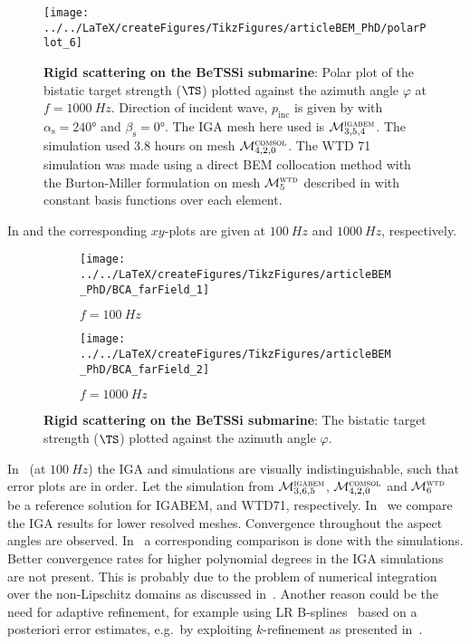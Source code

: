 \begin{figure}
	\centering
	\texttt{[image: ../../LaTeX/createFigures/TikzFigures/articleBEM\_PhD/polarPlot\_6]}
	\caption{\textbf{Rigid scattering on the BeTSSi submarine}: Polar plot of the bistatic target strength ($\TS$) plotted against the azimuth angle $\varphi$ at $f=\SI{1000}{Hz}$. Direction of incident wave, $p_{\mathrm{inc}}$ is given by  with $\alpha_{\mathrm{s}}=\ang{240}$ and $\beta_{\mathrm{s}}=\ang{0}$. The IGA mesh here used is ${\cal M}_{3,5,4}^{\textsc{igabem}}$. The \COMSOL simulation used \num{3.8} hours on mesh ${\cal M}_{4,2,0}^{\textsc{comsol}}$. The WTD 71 simulation was made using a direct BEM collocation method with the Burton-Miller formulation on mesh ${\cal M}_{5}^{\textsc{wtd}}$ described in  with constant basis functions over each element.}
	\label{Eq3:polar_BI}
\end{figure}
In  and  the corresponding $xy$-plots are given at $\SI{100}{Hz}$ and $\SI{1000}{Hz}$, respectively.
\begin{figure}
	\centering
	\begin{subfigure}[t]{\textwidth}
		\texttt{[image: ../../LaTeX/createFigures/TikzFigures/articleBEM\_PhD/BCA\_farField\_1]}
		\caption{$f=\SI{100}{Hz}$}
		\label{Fig3:xy_BI_100}
	\end{subfigure} 
	\par\bigskip
	\par\bigskip
	\begin{subfigure}[t]{\textwidth}
		\texttt{[image: ../../LaTeX/createFigures/TikzFigures/articleBEM\_PhD/BCA\_farField\_2]}
		\caption{$f=\SI{1000}{Hz}$}
		\label{Fig3:xy_BI_1000}
	\end{subfigure} 
	\caption{\textbf{Rigid scattering on the BeTSSi submarine}: The bistatic target strength ($\TS$) plotted against the azimuth angle $\varphi$.}
\end{figure}
In~ (at $\SI{100}{Hz}$) the IGA and \COMSOL simulations are visually indistinguishable, such that error plots are in order. Let the simulation from ${\cal M}_{3,6,5}^{\textsc{igabem}}$, ${\cal M}_{4,2,0}^{\textsc{comsol}}$ and ${\cal M}_{6}^{\textsc{wtd}}$ be a reference solution for IGABEM, \COMSOL and WTD71, respectively. In~ we compare the IGA results for lower resolved meshes. Convergence throughout the aspect angles are observed. In~ a corresponding comparison is done with the \COMSOL simulations. Better convergence rates for higher polynomial degrees in the IGA simulations are not present. This is probably due to the problem of numerical integration over the non-Lipschitz domains as discussed in~. Another reason could be the need for adaptive refinement, for example using LR B-splines~\cite{Johannessen2014iau} based on a posteriori error estimates, e.g.\ by exploiting $k$-refinement as presented in~\cite{Kumar2015sap}.
